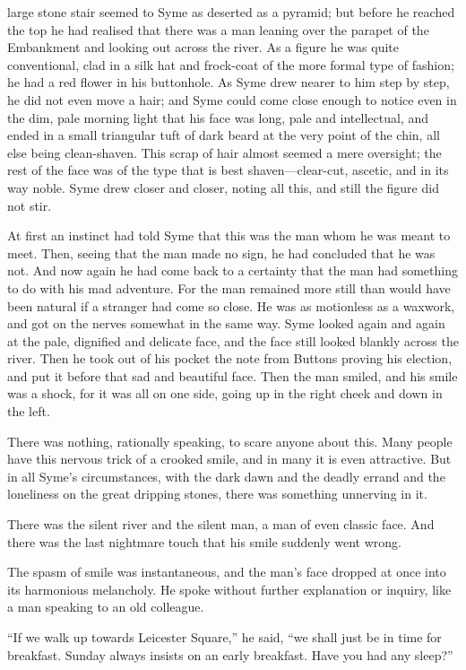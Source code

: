 large stone stair seemed to Syme as deserted as a pyramid; but before he reached the top he had realised that there was a man leaning over the parapet of the Embankment and looking out across the river. As a figure he was quite conventional, clad in a silk hat and frock-coat of the more formal type of fashion; he had a red flower in his buttonhole. As Syme drew nearer to him step by step, he did not even move a hair; and Syme could come close enough to notice even in the dim, pale morning light that his face was long, pale and intellectual, and ended in a small triangular tuft of dark beard at the very point of the chin, all else being clean-shaven. This scrap of hair almost seemed a mere oversight; the rest of the face was of the type that is best shaven⁠—clear-cut, ascetic, and in its way noble. Syme drew closer and closer, noting all this, and still the figure did not stir.

At first an instinct had told Syme that this was the man whom he was meant to meet. Then, seeing that the man made no sign, he had concluded that he was not. And now again he had come back to a certainty that the man had something to do with his mad adventure. For the man remained more still than would have been natural if a stranger had come so close. He was as motionless as a waxwork, and got on the nerves somewhat in the same way. Syme looked again and again at the pale, dignified and delicate face, and the face still looked blankly across the river. Then he took out of his pocket the note from Buttons proving his election, and put it before that sad and beautiful face. Then the man smiled, and his smile was a shock, for it was all on one side, going up in the right cheek and down in the left.

There was nothing, rationally speaking, to scare anyone about this. Many people have this nervous trick of a crooked smile, and in many it is even attractive. But in all Syme’s circumstances, with the dark dawn and the deadly errand and the loneliness on the great dripping stones, there was something unnerving in it.

There was the silent river and the silent man, a man of even classic face. And there was the last nightmare touch that his smile suddenly went wrong.

The spasm of smile was instantaneous, and the man’s face dropped at once into its harmonious melancholy. He spoke without further explanation or inquiry, like a man speaking to an old colleague.

“If we walk up towards Leicester Square,” he said, “we shall just be in time for breakfast. Sunday always insists on an early breakfast. Have you had any sleep?”

